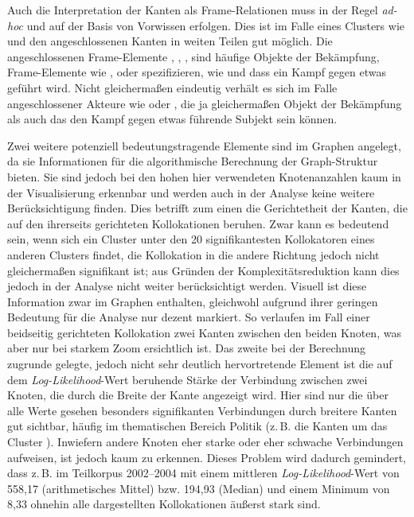 Auch die Interpretation der Kanten als Frame-Relationen muss in der Regel \emph{ad-hoc} und auf der Basis von Vorwissen erfolgen. Dies ist im Falle eines Clusters wie  und den angeschlossenen Kanten in weiten Teilen gut möglich. Die angeschlossenen Frame-Elemente , , ,  sind häufige Objekte der Bekämpfung, Frame-Elemente wie ,  oder  spezifizieren, wie und dass ein Kampf gegen etwas geführt wird. Nicht gleichermaßen eindeutig verhält es sich im Falle angeschlossener Akteure wie  oder , die ja gleichermaßen Objekt der Bekämpfung als auch das den Kampf gegen etwas führende Subjekt sein können.

\largerpage
Zwei weitere potenziell bedeutungstragende Elemente sind im Graphen angelegt, da sie Informationen für die algorithmische Berechnung der Graph-Struktur bieten. Sie sind jedoch bei den hohen hier verwendeten Knotenanzahlen kaum in der Visualisierung erkennbar und werden auch in der Analyse keine weitere Berücksichtigung finden. Dies betrifft zum einen die Gerichtetheit der Kanten, die auf den ihrerseits gerichteten Kollokationen beruhen. Zwar kann es bedeutend sein, wenn sich ein Cluster unter den 20 signifikantesten Kollokatoren eines anderen Clusters findet, die Kollokation in die andere Richtung jedoch nicht gleichermaßen signifikant ist; aus Gründen der Komplexitätsreduktion kann dies jedoch in der Analyse nicht weiter berücksichtigt werden. Visuell ist diese Information zwar im Graphen enthalten, gleichwohl aufgrund ihrer geringen Bedeutung für die Analyse nur dezent markiert. So verlaufen im Fall einer beidseitig gerichteten Kollokation zwei Kanten zwischen den beiden Knoten, was aber nur bei starkem Zoom ersichtlich ist. Das zweite bei der Berechnung zugrunde gelegte, jedoch nicht sehr deutlich hervortretende Element ist die auf dem \emph{Log-Likelihood}-Wert beruhende Stärke der Verbindung zwischen zwei Knoten, die durch die Breite der Kante angezeigt wird. Hier sind nur die über alle Werte gesehen besonders signifikanten Verbindungen durch breitere Kanten gut sichtbar, häufig im thematischen Bereich Politik (z.\,B. die Kanten um das Cluster ). Inwiefern andere Knoten eher starke oder eher schwache Verbindungen aufweisen, ist jedoch kaum zu erkennen. Dieses Problem wird dadurch gemindert, dass z.\,B. im Teilkorpus 2002--2004 mit einem mittleren \emph{Log-Likelihood}-Wert von 558,17 (arithmetisches Mittel) bzw. 194,93 (Median) und einem Minimum von 8,33 ohnehin alle dargestellten Kollokationen äußerst stark sind.

